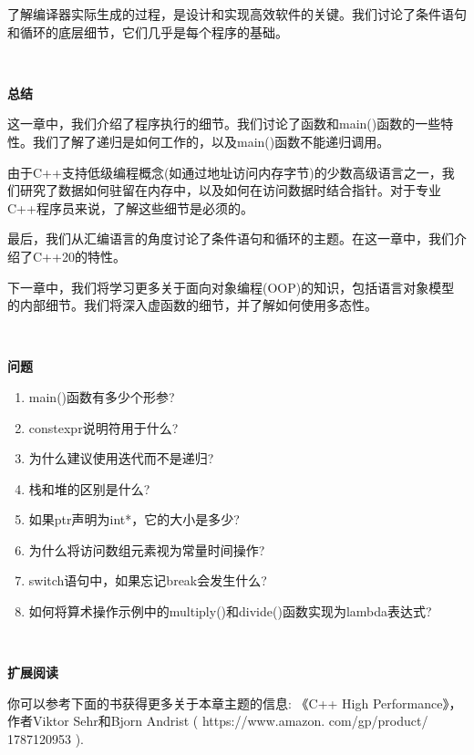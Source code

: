 了解编译器实际生成的过程，是设计和实现高效软件的关键。我们讨论了条件语句和循环的底层细节，它们几乎是每个程序的基础。 \par

\noindent\textbf{}\ \par
\textbf{总结} \ \par
这一章中，我们介绍了程序执行的细节。我们讨论了函数和main()函数的一些特性。我们了解了递归是如何工作的，以及main()函数不能递归调用。 \par
由于C++支持低级编程概念(如通过地址访问内存字节)的少数高级语言之一，我们研究了数据如何驻留在内存中，以及如何在访问数据时结合指针。对于专业C++程序员来说，了解这些细节是必须的。 \par
最后，我们从汇编语言的角度讨论了条件语句和循环的主题。在这一章中，我们介绍了C++20的特性。 \par
下一章中，我们将学习更多关于面向对象编程(OOP)的知识，包括语言对象模型的内部细节。我们将深入虚函数的细节，并了解如何使用多态性。 \par

\noindent\textbf{}\ \par
\textbf{问题} \ \par
\begin{enumerate}
	\item main()函数有多少个形参?
	\item constexpr说明符用于什么?
	\item 为什么建议使用迭代而不是递归?
	\item 栈和堆的区别是什么?
	\item 如果ptr声明为int*，它的大小是多少? 
	\item 为什么将访问数组元素视为常量时间操作?
	\item switch语句中，如果忘记break会发生什么?
	\item 如何将算术操作示例中的multiply()和divide()函数实现为lambda表达式?
\end{enumerate}

\noindent\textbf{}\ \par
\textbf{扩展阅读} \ \par
你可以参考下面的书获得更多关于本章主题的信息: 《C++ High Performance》，作者Viktor Sehr和Bjorn Andrist ( https:/​/​www.​amazon.
com/​gp/​product/​1787120953 ).\par

\newpage